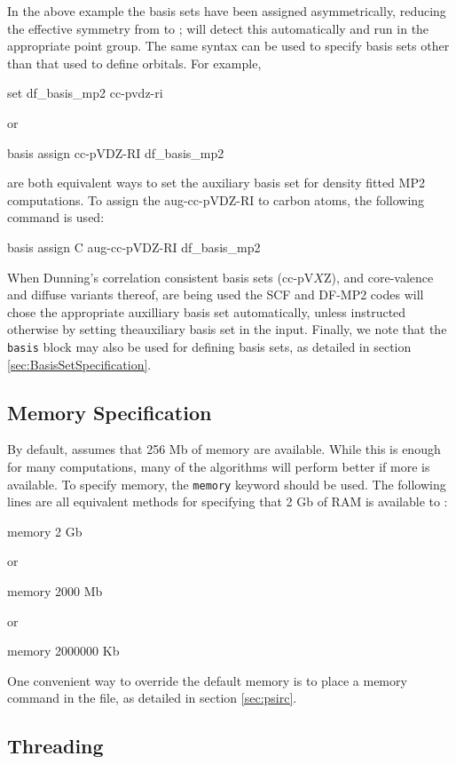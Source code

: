 In the above example the basis sets have been assigned asymmetrically, reducing
the effective symmetry from  to ; \PSIfour will detect this
automatically and run in the appropriate point group.  The same syntax can be
used to specify basis sets other than that used to define orbitals.  For
example, 

\begin{Snippet}
set df_basis_mp2 cc-pvdz-ri

 or

basis {
   assign cc-pVDZ-RI df_basis_mp2
}
\end{Snippet}
are both equivalent ways to set the auxiliary basis set for density fitted MP2
computations.  To assign the aug-cc-pVDZ-RI to carbon atoms, the following
command is used:
\begin{Snippet}
basis {
   assign C aug-cc-pVDZ-RI df_basis_mp2
}
\end{Snippet}

When Dunning's correlation consistent basis sets (cc-pV$X$Z), and core-valence
and diffuse variants thereof, are being used the SCF and DF-MP2 codes will
chose the appropriate auxilliary basis set automatically, unless instructed
otherwise by setting theauxiliary basis set in the input.  Finally, we note
that the {\tt basis} block may also be used for defining basis sets, as
detailed in section \ref{sec:BasisSetSpecification}.

\subsection{Memory Specification}
By default, \PSIfour assumes that 256 Mb of memory are available. While this is
enough for many computations, many of the algorithms will perform better if
more is available. To specify memory, the {\tt memory} keyword should be used. The following
lines are all equivalent methods for specifying that 2 Gb of RAM is available
to \PSIfour:
\begin{Snippet}
memory 2 Gb

 or

memory 2000 Mb

 or

memory 2000000 Kb
\end{Snippet}
One convenient way to override the \PSIfour default memory is to place a memory
command in the \psirc file, as detailed in section \ref{sec:psirc}.

\subsection{Threading}
\label{sec:threading}


